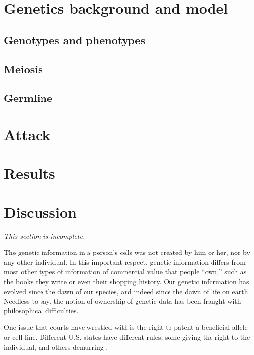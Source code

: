 \documentclass{article}
\begin{document}

\section{Genetics background and model}
\label{genetics-background}


\subsection{Genotypes and phenotypes}
\label{genotypephenotype}

\subsection{Meiosis}

\subsection{Germline}

\section{Attack}
\label{attack}

\section{Results}
\label{results}

\section{Discussion}
\label{discussion}
{\em This section is incomplete.}

The genetic information in a person's cells was not created by him or her, nor by any other individual. In this important respect, genetic information differs from most other types of information of commercial value that people ``own,'' such as the books they write or even their shopping history. Our genetic information has evolved since the dawn of our species, and indeed since the dawn of life on earth. Needless to say, the notion of ownership of genetic data has been fraught with philosophical difficulties.

One issue that courts have wrestled with is the right to patent a beneficial allele or cell line. Different U.S. states have different rules, some giving the right to the individual, and others demurring \cite{john-moore-who-owns-your-genetic-information}.
\end{document}
